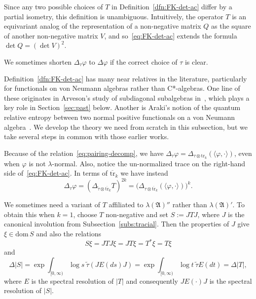 \documentclass[12pt,a4paper]{article}
\numberwithin{equation}{section}
\theoremstyle{remark}
\newcommand{\A}{\mathfrak{A}}
\renewcommand{\phi}{\varphi}
\renewcommand{\l}{\lambda}
\renewcommand{\t}[1]{\widetilde{#1}}
\newcommand{\dom}{\mathrm{dom}\,}
\newcommand{\tr}{\overline{\mathrm{tr}}}
\newcommand{\Tr}{\mathrm{tr}}
\begin{document}
Since any two possible choices of $T$ in Definition~\ref{dfn:FK-det-ac} differ by a partial isometry, this definition is unambiguous.  Intuitively, the operator $T$ is an equivariant analog of the representation of a non-negative matrix $Q$ as the square of another non-negative matrix $V$, and so~\eqref{eq:FK-det-ac} extends the formula $\det Q = (\det V)^2$.

We sometimes shorten $\Delta_\tau \phi$ to $\Delta \phi$ if the correct choice of $\tau$ is clear.

Definition~\ref{dfn:FK-det-ac} has many near relatives in the literature, particularly for functionals on von Neumann algebras rather than C*-algebras.  One line of these originates in Arveson's study of subdiagonal subalgebras in~\cite{Arv67}, which plays a key role in Section~\ref{sec:past} below.  Another is Araki's notion of the quantum relative entropy between two normal positive functionals on a von Neumann algebra~\cite{Ara7576,Ara7778}. We develop the theory we need from scratch in this subsection, but we take several steps in common with those earlier works. %

Because of the relation~\eqref{eq:pairing-decomp}, we have $\Delta_\tau \phi = \Delta_{\tau\otimes \Tr_k}(\langle \phi,\cdot\rangle)$, even when $\phi$ is not $\l$-normal.  Also, notice the un-normalized trace on the right-hand side of~\eqref{eq:FK-det-ac}. In terms of $\tr_k$ we have instead
\begin{equation}\label{eq:det-phi-det-pairing}
\Delta_\tau \phi = (\Delta_{\t{\tau}\otimes \tr_k} T)^{2k} = \big(\Delta_{\tau\otimes \tr_k}(\langle \phi,\cdot\rangle)\big)^k.
\end{equation}

We sometimes need a variant of $T$ affiliated to $\l(\A)''$ rather than $\l(\A)'$.  To obtain this when $k=1$, choose $T$ non-negative and set $S := JTJ$, where $J$ is the canonical involution from Subsection~\ref{subs:tracial}.  Then the properties of $J$ give $\xi \in \dom S$ and also the relations
\begin{equation}\label{eq:SJTJ1}
S\xi = JTJ\xi = JT\xi = T^\ast \xi = T\xi
\end{equation}
and
\begin{equation}\label{eq:SJTJ2}
\Delta |S| = \exp\int_{[0,\infty)}\log s\ \t{\tau} (JE(ds)J) = \exp\int_{[0,\infty)}\log t\ \t{\tau} E(dt) = \Delta |T|,
\end{equation}
where $E$ is the spectral resolution of $|T|$ and consequently $JE(\cdot )J$ is the spectral resolution of $|S|$.
\end{document}

